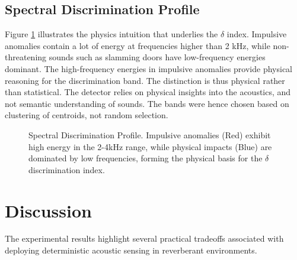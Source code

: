 \documentclass[conference]{IEEEtran}
\begin{document}
\subsection{Spectral Discrimination Profile}
Figure \ref{fig:spectral} illustrates the physics intuition that underlies the $\delta$ index. Impulsive anomalies contain a lot of energy at frequencies higher than 2 kHz, while non-threatening sounds such as slamming doors have low-frequency energies dominant. The high-frequency energies in impulsive anomalies provide physical reasoning for the discrimination band. The distinction is thus physical rather than statistical. The detector relies on physical insights into the acoustics, and not semantic understanding of sounds. The bands were hence chosen based on clustering of centroids, not random selection.

\begin{figure}[htbp]
\centering
{}
\caption{Spectral Discrimination Profile. Impulsive anomalies (Red) exhibit high energy in the 2-4kHz range, while physical impacts (Blue) are dominated by low frequencies, forming the physical basis for the $\delta$ discrimination index.}
\label{fig:spectral}
\end{figure}

\section{Discussion}

The experimental results highlight several practical tradeoffs associated with deploying deterministic acoustic sensing in reverberant environments.
\end{document}
